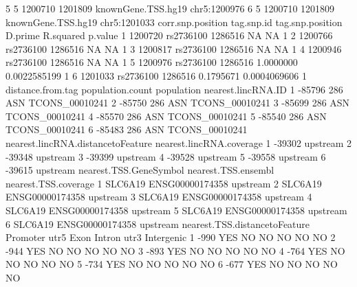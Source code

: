 \documentclass[12pt,fullpage]{article}
\begin{document}
\begin{Schunk}
\begin{Soutput}
5          5           1200710         1201809 knownGene.TSS.hg19 chr5:1200976
6          5           1200710         1201809 knownGene.TSS.hg19 chr5:1201033
  corr.snp.position tag.snp.id tag.snp.position   D.prime    R.squared p.value
1           1200720  rs2736100          1286516        NA           NA       1
2           1200766  rs2736100          1286516        NA           NA       1
3           1200817  rs2736100          1286516        NA           NA       1
4           1200946  rs2736100          1286516        NA           NA       1
5           1200976  rs2736100          1286516 1.0000000 0.0022585199       1
6           1201033  rs2736100          1286516 0.1795671 0.0004069606       1
  distance.from.tag population.count population nearest.lincRNA.ID
1            -85796              286        ASN     TCONS_00010241
2            -85750              286        ASN     TCONS_00010241
3            -85699              286        ASN     TCONS_00010241
4            -85570              286        ASN     TCONS_00010241
5            -85540              286        ASN     TCONS_00010241
6            -85483              286        ASN     TCONS_00010241
  nearest.lincRNA.distancetoFeature nearest.lincRNA.coverage
1                            -39302                 upstream
2                            -39348                 upstream
3                            -39399                 upstream
4                            -39528                 upstream
5                            -39558                 upstream
6                            -39615                 upstream
  nearest.TSS.GeneSymbol nearest.TSS.ensembl nearest.TSS.coverage
1                SLC6A19     ENSG00000174358             upstream
2                SLC6A19     ENSG00000174358             upstream
3                SLC6A19     ENSG00000174358             upstream
4                SLC6A19     ENSG00000174358             upstream
5                SLC6A19     ENSG00000174358             upstream
6                SLC6A19     ENSG00000174358             upstream
  nearest.TSS.distancetoFeature Promoter utr5 Exon Intron utr3 Intergenic
1                          -990      YES   NO   NO     NO   NO         NO
2                          -944      YES   NO   NO     NO   NO         NO
3                          -893      YES   NO   NO     NO   NO         NO
4                          -764      YES   NO   NO     NO   NO         NO
5                          -734      YES   NO   NO     NO   NO         NO
6                          -677      YES   NO   NO     NO   NO         NO
\end{Soutput}

\end{Schunk}
\end{document}
